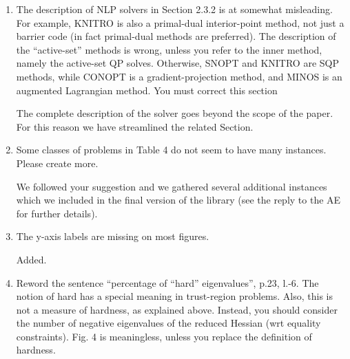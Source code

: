 \documentclass[11pt]{article}
\newcommand{\rep}[1]{{\textcolor{acblue}{#1}}}
\newcommand{\leo}[1]{{\color{red}#1}}
\begin{document}
{\begin{enumerate}
\rep{We added a comment about this issue in Section 2.1 
}


\item The description of NLP solvers in Section 2.3.2 is at somewhat misleading. For example, KNITRO is also a primal-dual interior-point method, not just a barrier code (in fact primal-dual
methods are preferred). The description of the “active-set” methods is wrong, unless you refer
to the inner method, namely the active-set QP solves. Otherwise, SNOPT and KNITRO are
SQP methods, while CONOPT is a gradient-projection method, and MINOS is an augmented
Lagrangian method. You must correct this section

\rep{The complete description of the solver goes beyond the scope of the paper. For this reason we have streamlined the related Section.
}


\item Some classes of problems in Table 4 do not seem to have many instances. Please create more.

\rep{We followed your suggestion and we gathered several additional instances which we included in the final version of the library (see the reply to the AE for further details).}

\item The y-axis labels are missing on most figures.

\rep{
Added.
}


\item Reword the sentence ``percentage of ``hard'' eigenvalues'', p.23, l.-6. The notion of hard has a
special meaning in trust-region problems. Also, this is not a measure of hardness, as explained
above. Instead, you should consider the number of negative eigenvalues of the reduced Hessian
(wrt equality constraints). Fig. 4 is meaningless, unless you replace the definition of hardness.


\end{enumerate}}
\end{document}
